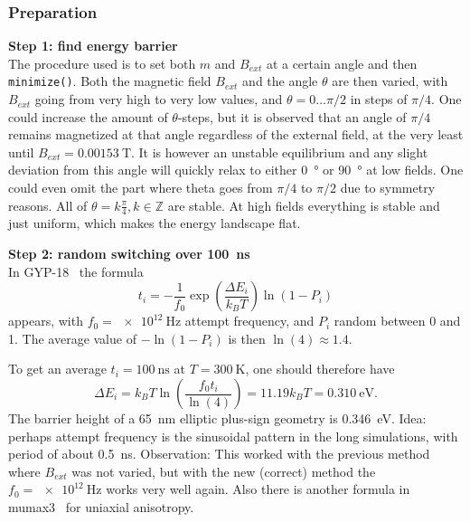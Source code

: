 \documentclass[10pt,a4paper]{article}
\newcommand{\code}[1]{\texttt{#1}}
\begin{document}
\subsubsection{Preparation}
\textbf{Step 1: find energy barrier} \\
The procedure used is to set both $m$ and $B_{ext}$ at a certain angle and then \code{minimize()}. Both the magnetic field $B_{ext}$ and the angle $\theta$ are then varied, with $B_{ext}$ going from very high to very low values, and $\theta=0\dots\pi/2$ in steps of $\pi/4$. One could increase the amount of $\theta$-steps, but it is observed that an angle of $\pi/4$ remains magnetized at that angle regardless of the external field, at the very least until $B_{ext} = \SI{0.00153}{\tesla}$. It is however an unstable equilibrium and any slight deviation from this angle will quickly relax to either \SI{0}{\degree} or \SI{90}{\degree} at low fields.
One could even omit the part where theta goes from $\pi/4$ to $\pi/2$ due to symmetry reasons.
All of $\theta = k\frac{\pi}{4} , k\in\mathbb{Z}$ are stable.
At high fields everything is stable and just uniform, which makes the energy landscape flat.

\textbf{Step 2: random switching over \SI{100}{\nano\second}} \\
In GYP-18~\cite{GYP-18} the formula
\begin{equation}
    t_i = -\frac{1}{f_0} \exp(\frac{\Delta E_i}{k_B T}) \ln(1-P_i)
    \label{eq:Switching_time}
\end{equation}
appears, with $f_0 = \SI{e12}{\hertz}$ attempt frequency, and $P_i$ random between 0 and 1. The average value of $-\ln(1-P_i)$ is then $\ln(4) \approx 1.4$.

To get an average $t_i = \SI{100}{\nano\second}$ at $T=\SI{300}{\kelvin}$, one should therefore have
\begin{equation}
    \Delta E_i = k_B T \ln(\frac{f_0 t_i}{\ln(4)}) = 11.19 k_B T = \SI{0.310}{\electronvolt} \mathrm{.}
\end{equation}
The barrier height of a \SI{65}{\nano\metre} elliptic plus-sign geometry is \SI{0.346}{\electronvolt}.
Idea: perhaps attempt frequency is the sinusoidal pattern in the long simulations, with period of about \SI{0.5}{\nano\second}. Observation: This worked with the previous method where $B_{ext}$ was not varied, but with the new (correct) method the $f_0 = \SI{e12}{\hertz}$ works very well again.
Also there is another formula in mumax3~\cite{MuMax3} for uniaxial anisotropy.
\end{document}
